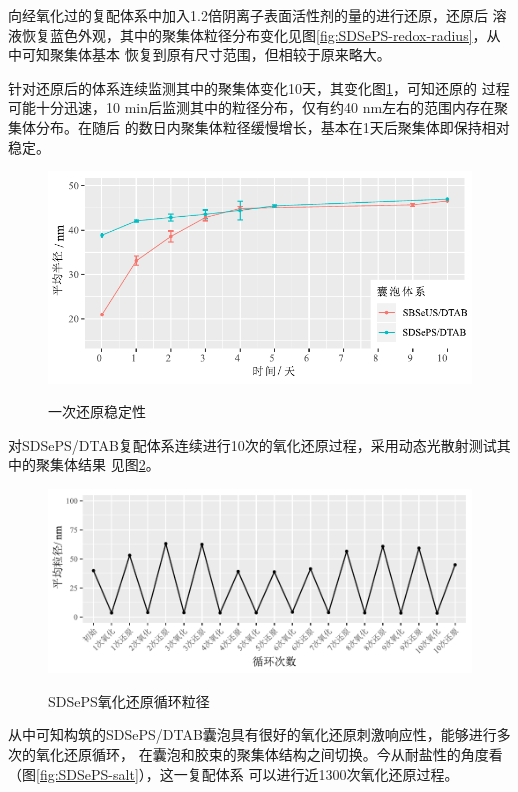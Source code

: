 \documentclass[bachelor,fandolfonts,replaceperiod]{jnuthesis}
\begin{document}
    向经氧化过的复配体系中加入1.2倍阴离子表面活性剂的量的进行还原，还原后
    溶液恢复蓝色外观，其中的聚集体粒径分布变化见图\ref{fig:SDSePS-redox-radius}，从中可知聚集体基本
    恢复到原有尺寸范围，但相较于原来略大。
    
    针对还原后的体系连续监测其中的聚集体变化10天，其变化图\ref{fig:vesicle-Re-stability}，可知还原的
    过程可能十分迅速，10 min后监测其中的粒径分布，仅有约40 nm左右的范围内存在聚集体分布。在随后
    的数日内聚集体粒径缓慢增长，基本在1天后聚集体即保持相对稳定。
    
    \begin{figure}[htbp]
        \centering
        \includegraphics[width=.76\textwidth]{figure/vesicle-Re-stability.pdf}\\
        \caption{一次还原稳定性}\label{fig:vesicle-Re-stability}
    \end{figure}
    
    对SDSePS/DTAB复配体系连续进行10次的氧化还原过程，采用动态光散射测试其中的聚集体结果
    见图\ref{fig:SDSePS-redox-circle}。
    \begin{figure}[htbp]
        \centering
        \includegraphics[width=.86\textwidth]{figure/SDSePS-redox-circle.pdf}\\
        \caption{SDSePS氧化还原循环粒径}\label{fig:SDSePS-redox-circle}
    \end{figure}
    从中可知构筑的SDSePS/DTAB囊泡具有很好的氧化还原刺激响应性，能够进行多次的氧化还原循环，
    在囊泡和胶束的聚集体结构之间切换。今从耐盐性的角度看（图\ref{fig:SDSePS-salt}），这一复配体系
    可以进行近1300次氧化还原过程。
    
\end{document}
